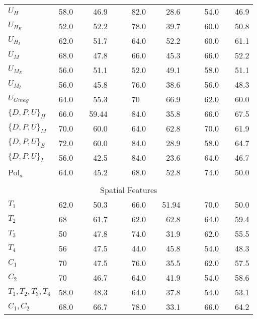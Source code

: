 \begin{table}
\begin{center}
{{\begin{tabular}{l lcr cc lcr cc lcr }
$U_{H}$ 	    & 58.0 & & 46.9 & & & 82.0 & & 28.6 & & & 54.0 & & 46.9\\
$U_{H_{E}}$ & 52.0 & & 52.2 & & & 78.0 & & 39.7 & & & 60.0 & & 50.8\\
$U_{H_{I}}$ & 62.0 & & 51.7 & & & 64.0 & & 52.2 & & & 60.0 & & 61.1\\
$U_{M}$	 	& 68.0 & & 47.8 & & & 66.0 & & 45.3 & & & 66.0 & & 52.2\\
$U_{M_{E}}$ & 56.0 & & 51.1 & & & 52.0 & & 49.1 & & & 58.0 & & 51.1\\
$U_{M_{I}}$ & 56.0 & & 45.8 & & & 76.0 & & 38.6 & & & 56.0 & & 48.3\\
$U_{Gmag}$  & 64.0 & & 55.3 & & &\cellcolor[gray]{0.8}70 &\cellcolor[gray]{0.8}&\cellcolor[gray]{0.8}66.9 & & & 62.0 & & 60.0\\
$\{D,P,U\}_{H}$ & 66.0 & & 59.44 & & & 84.0 & & 35.8 & & & 66.0 & & 67.5\\
$\{D,P,U\}_{M}$ &\cellcolor[gray]{0.8}70.0 &\cellcolor[gray]{0.8}&\cellcolor[gray]{0.8}60.0 & & & 64.0 & & 62.8 & & &\cellcolor[gray]{0.8}70.0 &\cellcolor[gray]{0.8}&\cellcolor[gray]{0.8}61.9\\
$\{D,P,U\}_{E}$ &\cellcolor[gray]{0.8}72.0 &\cellcolor[gray]{0.8}&\cellcolor[gray]{0.8}60.0 & & & 84.0 & & 28.9 & & & 58.0 & & 64.7\\
$\{D,P,U\}_{I}$ & 56.0 & & 42.5 & & & 84.0 & & 23.6 & & & 64.0 & & 46.7\\
Pol$_{a}$ & 64.0 & & 45.2 & & & 68.0 & & 52.8 & & & 74.0 & & 50.0\\\\[-2ex]
\midrule
\multicolumn{14}{c}{Spatial Features}\\
\midrule
$T_{1}$ & 62.0 & & 50.3 & & & 66.0 & & 51.94 & & & 70.0 & & 50.0\\
$T_{2}$ &\cellcolor[gray]{0.8}68 &\cellcolor[gray]{0.8}&\cellcolor[gray]{0.8}61.7 & & &\cellcolor[gray]{0.8}62.0 &\cellcolor[gray]{0.8}&\cellcolor[gray]{0.8}62.8 & & & 64.0 & & 59.4\\
$T_{3}$ & 50 & & 47.8 & & & 74.0 & & 31.9 & & & 62.0 & & 55.5\\
$T_{4}$ & 56 & & 47.5 & & & 44.0 & & 45.8 & & & 54.0 & & 48.3\\
$C_{1}$ & 70 & & 47.5 & & & 76.0 & & 35.5 & & & 62.0 & & 57.5\\
$C_{2}$ & 70 & & 46.7 & & & 64.0 & & 41.9 & & & 54.0 & & 58.6\\
$T_{1},T_{2},T_{3},T_{4}$ & 58.0 & & 48.3 & & & 	64.0 & & 37.8 & & & 	54.0 & & 53.1\\
$C_{1},C_{2}$ &\cellcolor[gray]{0.8}68.0 &\cellcolor[gray]{0.8}&\cellcolor[gray]{0.8}66.7 & & & 	78.0 & & 33.1 & & &\cellcolor[gray]{0.8}66.0 &\cellcolor[gray]{0.8}&\cellcolor[gray]{0.8}64.2\\
\bottomrule

\end{tabular}}}
\end{center}
\label{tab:table6}
\end{table}











